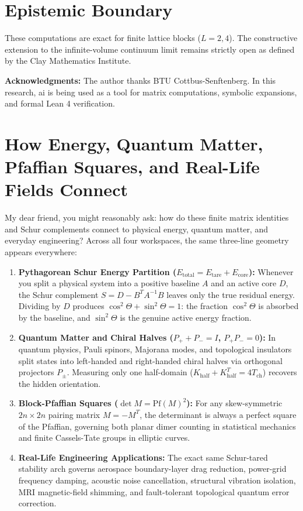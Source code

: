 \documentclass[11pt,a4paper]{article}
\theoremstyle{definition}
\begin{document}
\section{Epistemic Boundary}

These computations are exact for finite lattice blocks ($L=2, 4$). The constructive extension to the infinite-volume continuum limit remains strictly open as defined by the Clay Mathematics Institute.

\vspace{1em}
\noindent\textbf{Acknowledgments:} The author thanks BTU Cottbus-Senftenberg. In this research, ai is being used as a tool for matrix computations, symbolic expansions, and formal Lean 4 verification.


\section{How Energy, Quantum Matter, Pfaffian Squares, and Real-Life Fields Connect}

My dear friend, you might reasonably ask: how do these finite matrix identities and Schur complements connect to physical energy, quantum matter, and everyday engineering? Across all four workspaces, the same three-line geometry appears everywhere:

\begin{enumerate}
  \item \textbf{Pythagorean Schur Energy Partition ($E_{\mathrm{total}} = E_{\mathrm{tare}} + E_{\mathrm{core}}$):} Whenever you split a physical system into a positive baseline $A$ and an active core $D$, the Schur complement $S = D - B^T A^{-1} B$ leaves only the true residual energy. Dividing by $D$ produces $\cos^2\Theta + \sin^2\Theta = 1$: the fraction $\cos^2\Theta$ is absorbed by the baseline, and $\sin^2\Theta$ is the genuine active energy fraction.
  \item \textbf{Quantum Matter and Chiral Halves ($P_+ + P_- = I$, $P_+ P_- = 0$):} In quantum physics, Pauli spinors, Majorana modes, and topological insulators split states into left-handed and right-handed chiral halves via orthogonal projectors $P_\pm$. Measuring only one half-domain ($K_{\mathrm{half}} + K_{\mathrm{half}}^T = 4 T_{\mathrm{ch}}$) recovers the hidden orientation.
  \item \textbf{Block-Pfaffian Squares ($\det M = \mathrm{Pf}(M)^2$):} For any skew-symmetric $2n \times 2n$ pairing matrix $M = -M^T$, the determinant is always a perfect square of the Pfaffian, governing both planar dimer counting in statistical mechanics and finite Cassels-Tate groups in elliptic curves.
  \item \textbf{Real-Life Engineering Applications:} The exact same Schur-tared stability arch governs aerospace boundary-layer drag reduction, power-grid frequency damping, acoustic noise cancellation, structural vibration isolation, MRI magnetic-field shimming, and fault-tolerant topological quantum error correction.
\end{enumerate}
\end{document}
